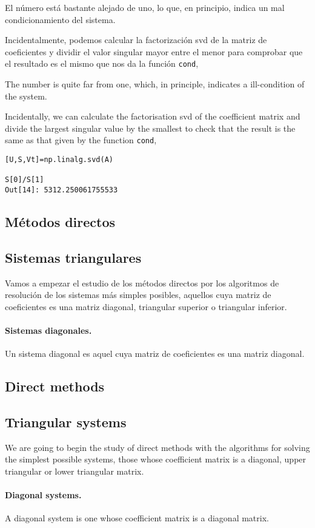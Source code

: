 \begin{paracol}{2}
El número está bastante alejado de uno, lo que, en principio, indica un mal condicionamiento del sistema. 

Incidentalmente, podemos calcular la factorización svd de la matriz de coeficientes y dividir el valor singular mayor entre el menor para comprobar que el resultado es el mismo que nos da la función \texttt{cond},

\switchcolumn
The number is quite far from one, which, in principle, indicates a ill-condition of the system. 

Incidentally, we can calculate the factorisation svd of the coefficient matrix and divide the largest singular value by the smallest to check that the result is the same as that given by the function \texttt{cond},
\end{paracol}

\begin{verbatim}
[U,S,Vt]=np.linalg.svd(A)

S[0]/S[1]
Out[14]: 5312.250061755533
\end{verbatim}

\begin{paracol}{2}
\section{Métodos directos}
\subsection{Sistemas triangulares}
Vamos a empezar el estudio de los métodos directos por los algoritmos de resolución de los sistemas más simples posibles, aquellos cuya matriz de coeficientes es una matriz diagonal, triangular superior o triangular inferior.
\paragraph{Sistemas diagonales.} Un sistema diagonal es aquel cuya matriz de coeficientes es una matriz diagonal. 

\switchcolumn

\subsection{Direct methods}
\subsection{Triangular systems}
We are going to begin the study of direct methods with the algorithms for solving the simplest possible systems, those whose coefficient matrix is a diagonal, upper triangular or lower triangular matrix.
\paragraph{ Diagonal systems.} A diagonal system is one whose coefficient matrix is a diagonal matrix. 
\end{paracol}

